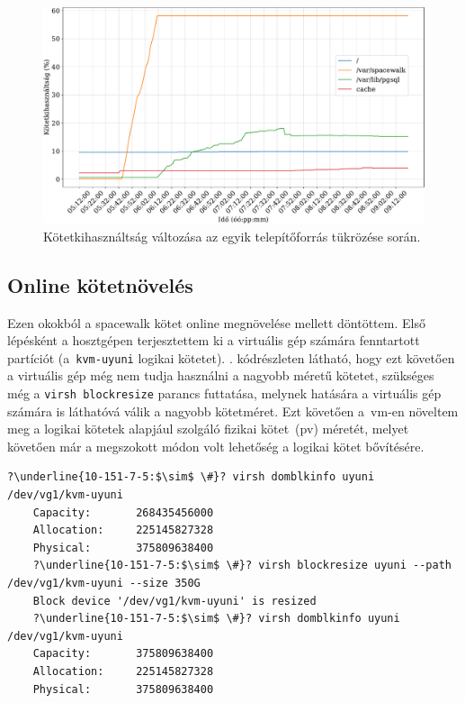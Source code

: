 \begin{figure}[ht]
	\centering
	\includegraphics[width=15cm]{figures/reposync-leap-oss-disk-grid.pdf}
	\caption{Kötetkihasználtság változása az egyik telepítőforrás tükrözése során.}
	\label{fig:reposync-disk-usage}
\end{figure}

\subsection{Online kötetnövelés}
Ezen okokból a spacewalk kötet online megnövelése mellett döntöttem. Első lépésként a hosztgépen terjesztettem ki a virtuális gép számára fenntartott partíciót (a~\texttt{kvm-uyuni} logikai kötetet). . kódrészleten látható, hogy ezt követően a virtuális gép még nem tudja használni a nagyobb méretű kötetet, szükséges még a \texttt{virsh blockresize} parancs futtatása, melynek hatására a virtuális gép számára is láthatóvá válik a nagyobb kötetméret. Ezt követően a~\acrshort{vm}-en növeltem meg a logikai kötetek alapjául szolgáló fizikai kötet~(\acrshort{pv}) méretét, melyet követően már a megszokott módon volt lehetőség a logikai kötet bővítésére.

\begin{lstlisting}[caption=Az infrastruktúramenedzsment-programokat futtató virtuális gép kötetének online megnövelése a gazdagépen.,label=lst:virsh-blockresize,escapechar=?]
	?\underline{10-151-7-5:$\sim$ \#}? virsh domblkinfo uyuni /dev/vg1/kvm-uyuni
	Capacity:       268435456000
	Allocation:     225145827328
	Physical:       375809638400
	?\underline{10-151-7-5:$\sim$ \#}? virsh blockresize uyuni --path /dev/vg1/kvm-uyuni --size 350G
	Block device '/dev/vg1/kvm-uyuni' is resized
	?\underline{10-151-7-5:$\sim$ \#}? virsh domblkinfo uyuni /dev/vg1/kvm-uyuni
	Capacity:       375809638400
	Allocation:     225145827328
	Physical:       375809638400
\end{lstlisting}

